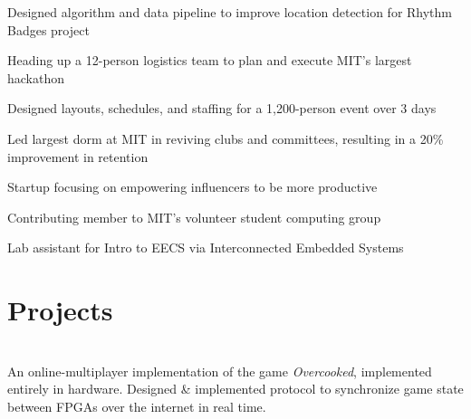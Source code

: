 \hfill {}
\begin{tightemize}
	\item Designed algorithm and data pipeline to improve location detection for Rhythm Badges project
\end{tightemize}
\sectionsep

\hfill {}
\begin{tightemize}
    \item Heading up a 12-person logistics team to plan and execute MIT's largest hackathon 
    \item Designed layouts, schedules, and staffing for a 1,200-person event over 3 days
\end{tightemize}
\sectionsep

\hfill {}
\begin{tightemize}
    \item Led largest dorm at MIT in reviving clubs and committees, resulting in a 20\% improvement in retention
\end{tightemize}
\sectionsep

\descript{}\hfill \location{}
\begin{tightemize}
    \item {} Startup focusing on empowering influencers to be more productive
    \item {} Contributing member to MIT's volunteer student computing group
    \item {} Lab assistant for Intro to EECS via Interconnected Embedded Systems
\end{tightemize}
\sectionsep

\section{Projects}
\raggedright

\hfill {}\\
An online-multiplayer implementation of the game \emph{Overcooked}, implemented entirely in hardware. Designed \& implemented protocol to synchronize game state between FPGAs over the internet in real time.
\newline

